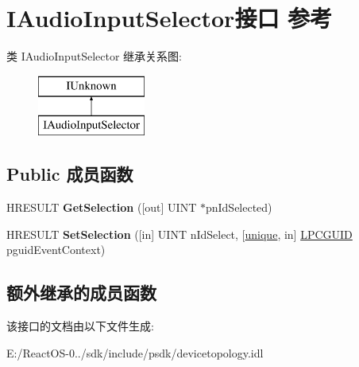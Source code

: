 \hypertarget{interface_i_audio_input_selector}{}\section{I\+Audio\+Input\+Selector接口 参考}
\label{interface_i_audio_input_selector}
类 I\+Audio\+Input\+Selector 继承关系图\+:\begin{figure}[H]
\begin{center}
\leavevmode
\includegraphics[height=2.000000cm]{interface_i_audio_input_selector}
\end{center}
\end{figure}
\subsection*{Public 成员函数}
\begin{DoxyCompactItemize}
\item 
\mbox{\label{interface_i_audio_input_selector_a790a0178a415786aab07d5f5deb07bbc}} 
H\+R\+E\+S\+U\+LT {\bfseries Get\+Selection} (\mbox{[}out\mbox{]} U\+I\+NT $\ast$pn\+Id\+Selected)
\item 
\mbox{\label{interface_i_audio_input_selector_a01e431ac5e24afd7428ad91e01110f0c}} 
H\+R\+E\+S\+U\+LT {\bfseries Set\+Selection} (\mbox{[}in\mbox{]} U\+I\+NT n\+Id\+Select, \mbox{[}\hyperlink{interfaceunique}{unique}, in\mbox{]} \hyperlink{interface_g_u_i_d}{L\+P\+C\+G\+U\+ID} pguid\+Event\+Context)
\end{DoxyCompactItemize}
\subsection*{额外继承的成员函数}


该接口的文档由以下文件生成\+:\begin{DoxyCompactItemize}
\item 
E\+:/\+React\+O\+S-\/0../sdk/include/psdk/devicetopology.\+idl\end{DoxyCompactItemize}
